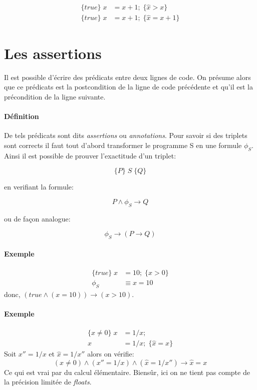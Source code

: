 \documentclass[12pt]{article}
\begin{document}
\begin{align*}  
    \{true\}\; x &= x+1;\; \{\hat{x}>x\}\\
    \{true\}\; x &= x+1;\; \{\hat{x} = x + 1\}
\end{align*}

\section*{Les assertions}
Il est possible d'écrire des prédicats entre deux lignes de code. On
présume alors que ce prédicats est la postcondition de la ligne de code
précédente et qu'il est la précondition de la ligne suivante.

\paragraph*{Définition}

De tels prédicats sont dits \emph{assertions} ou \emph{annotations}.
Pour savoir si des triplets sont corrects il faut tout d'abord transformer
le programme S en une formule \(\phi_{S}\). Ainsi il est possible de prouver
l'exactitude d'un triplet:

\begin{equation*}
    \{P\}\; S\; \{Q\}
\end{equation*}

en verifiant la formule: 

\begin{equation*}
    P \wedge \phi_{S} \rightarrow Q
\end{equation*}

ou de façon analogue:

\begin{equation*}
    \phi_{S} \rightarrow (P \rightarrow Q)
\end{equation*}

\paragraph*{Exemple}
\begin{align*}
    \{true\}\; x &= 10; \; \{x > 0\}\\
    \phi_{S} &\equiv x = 10
\end{align*}
donc, $(true \wedge ( x = 10))\rightarrow (x>10)$.
\paragraph*{Exemple}
\begin{align*}
    \{x \neq 0\}\; x &= 1/x;\\
    x &= 1/x; \; \{\hat{x} = x\}
\end{align*}
Soit $x'' = 1/x$ et $\hat{x} = 1/x''$ alors on vérifie:
\begin{equation*}
    (x \neq 0) \wedge (x'' = 1/x) \wedge (\hat{x} = 1/x'') \rightarrow \hat{x} = x
\end{equation*}
Ce qui est vrai par du calcul élémentaire. Biensûr, ici on ne tient pas
compte de la précision limitée de \emph{floats}.
\end{document}
